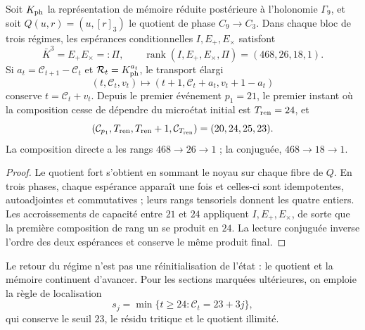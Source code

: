 \begin{proposition}
\label{v:prop:renovacion-capacidad-24}
Soit $K_{\rm ph}$ la représentation de mémoire réduite postérieure à
l’holonomie $\Gamma_9$, et soit $Q(u,r)=(u,[r]_3)$ le quotient de phase
$C_9\to C_3$. Dans chaque bloc de trois régimes, les espérances conditionnelles
$I,E_+,E_\times$ satisfont
\[
 \bar K^3=E_+E_\times=:\Pi,\qquad
 \operatorname{rank}(I,E_+,E_\times,\Pi)=(468,26,18,1).
\]
Si $a_t=\mathcal C_{t+1}-\mathcal C_t$ et
$\mathcal R_t=K_{\rm ph}^{a_t}$, le transport élargi
\[
 (t,\mathcal C_t,v_t)\longmapsto
 (t+1,\mathcal C_t+a_t,v_t+1-a_t)
\]
conserve $t=\mathcal C_t+v_t$. Depuis le premier événement $p_1=21$, le
premier instant où la composition cesse de dépendre du microétat
initial est $T_{\rm ren}=24$, et
\begin{equation}
 (\mathcal C_{p_1},T_{\rm ren},T_{\rm ren}+1,
   \mathcal C_{T_{\rm ren}})=(20,24,25,23).
 \label{v:eq:tupla-renovacion-capacidad}
\end{equation}
La composition directe a les rangs $468\to26\to1$ ; la conjuguée,
$468\to18\to1$.
\end{proposition}
\begin{proof}
Le quotient fort s’obtient en sommant le noyau sur chaque fibre de $Q$.
En trois phases, chaque espérance apparaît une fois et celles-ci sont idempotentes,
autoadjointes et commutatives ; leurs rangs tensoriels donnent les quatre entiers.
Les accroissements de capacité entre $21$ et $24$ appliquent
$I,E_+,E_\times$, de sorte que la première composition de rang un se produit
en $24$. La lecture conjuguée inverse l’ordre des deux espérances et
conserve le même produit final.
\end{proof}

Le retour du régime n’est pas une réinitialisation de l’état : le quotient et la mémoire
continuent d’avancer. Pour les sections marquées ultérieures, on emploie la
règle de localisation
\[
 s_j=\min\{t\ge24:\mathcal C_t=23+3j\},
\]
qui conserve le seuil $23$, le résidu tritique et le quotient illimité.
